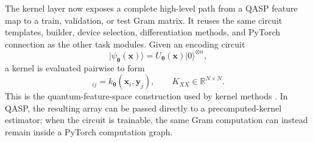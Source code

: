 \documentclass[10pt]{article}
\newcommand{\R}{\mathbb{R}}
\begin{document}
The kernel layer now exposes a complete high-level path from a QASP feature
map to a train, validation, or test Gram matrix.  It reuses the same circuit
templates, builder, device selection, differentiation methods, and PyTorch
connection as the other task modules.  Given an
encoding circuit
\begin{equation}
  \lvert\psi_{\bm{\theta}}(\bm{x})\rangle
  =U_{\bm{\theta}}(\bm{x})\lvert0\rangle^{\otimes n},
  \label{eq:kernel-feature-state}
\end{equation}
a kernel is evaluated pairwise to form
\begin{equation}
  [K_{XY}]_{ij}=k_{\bm{\theta}}(\bm{x}_i,\bm{y}_j),
  \qquad
  K_{XX}\in\R^{N\times N}.
  \label{eq:kernel-gram}
\end{equation}
This is the quantum-feature-space construction used by kernel methods
\cite{schuld2019feature,havlicek2019supervised}.  In QASP, the resulting array
can be passed directly to a precomputed-kernel estimator; when the circuit is
trainable, the same Gram computation can instead remain inside a PyTorch
computation graph.
\end{document}
